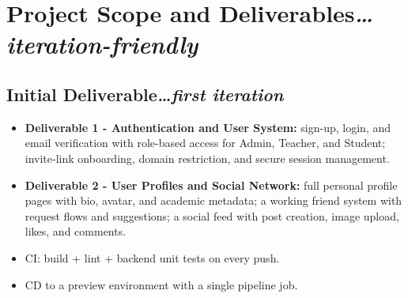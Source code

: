 \documentclass[11pt,a4paper]{article}
\newcommand{\BvrHint}[1]{{\normalfont\normalsize\itshape\hfill #1}}
\begin{document}
\section{Project Scope and Deliverables\BvrHint{\ldots iteration-friendly}}

\subsection{Initial Deliverable\BvrHint{\ldots first iteration}}
\begin{itemize}[leftmargin=0.7cm]
    \item \textbf{Deliverable 1 - Authentication and User System:} sign-up, login, and email verification with role-based access for Admin, Teacher, and Student; invite-link onboarding, domain restriction, and secure session management.
    \item \textbf{Deliverable 2 - User Profiles and Social Network:} full personal profile pages with bio, avatar, and academic metadata; a working friend system with request flows and suggestions; a social feed with post creation, image upload, likes, and comments.
    \item CI: build + lint + backend unit tests on every push.
    \item CD to a preview environment with a single pipeline job.
\end{itemize}
\end{document}
